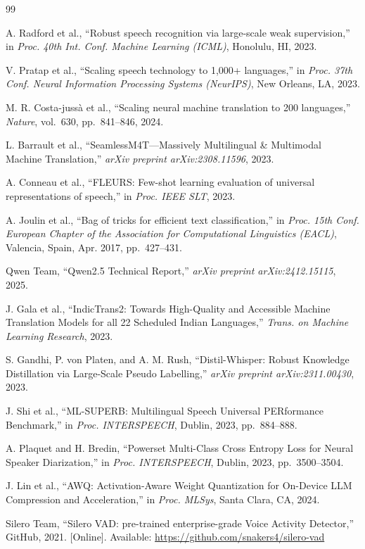 \documentclass[conference]{IEEEtran}
\begin{document}
\begin{thebibliography}{99}

 A. Radford et al., ``Robust speech recognition via large-scale weak supervision,'' in \textit{Proc. 40th Int. Conf. Machine Learning (ICML)}, Honolulu, HI, 2023.

 V. Pratap et al., ``Scaling speech technology to 1,000+ languages,'' in \textit{Proc. 37th Conf. Neural Information Processing Systems (NeurIPS)}, New Orleans, LA, 2023.

 M. R. Costa-juss\`a et al., ``Scaling neural machine translation to 200 languages,'' \textit{Nature}, vol.~630, pp.~841--846, 2024.

 L. Barrault et al., ``SeamlessM4T---Massively Multilingual \& Multimodal Machine Translation,'' \textit{arXiv preprint arXiv:2308.11596}, 2023.

 A. Conneau et al., ``FLEURS: Few-shot learning evaluation of universal representations of speech,'' in \textit{Proc. IEEE SLT}, 2023.

 A. Joulin et al., ``Bag of tricks for efficient text classification,'' in \textit{Proc. 15th Conf. European Chapter of the Association for Computational Linguistics (EACL)}, Valencia, Spain, Apr. 2017, pp.~427--431.

 Qwen Team, ``Qwen2.5 Technical Report,'' \textit{arXiv preprint arXiv:2412.15115}, 2025.

 J. Gala et al., ``IndicTrans2: Towards High-Quality and Accessible Machine Translation Models for all 22 Scheduled Indian Languages,'' \textit{Trans. on Machine Learning Research}, 2023.

 S. Gandhi, P. von Platen, and A. M. Rush, ``Distil-Whisper: Robust Knowledge Distillation via Large-Scale Pseudo Labelling,'' \textit{arXiv preprint arXiv:2311.00430}, 2023.

 J. Shi et al., ``ML-SUPERB: Multilingual Speech Universal PERformance Benchmark,'' in \textit{Proc. INTERSPEECH}, Dublin, 2023, pp.~884--888.

 A. Plaquet and H. Bredin, ``Powerset Multi-Class Cross Entropy Loss for Neural Speaker Diarization,'' in \textit{Proc. INTERSPEECH}, Dublin, 2023, pp.~3500--3504.

 J. Lin et al., ``AWQ: Activation-Aware Weight Quantization for On-Device LLM Compression and Acceleration,'' in \textit{Proc. MLSys}, Santa Clara, CA, 2024.

 Silero Team, ``Silero VAD: pre-trained enterprise-grade Voice Activity Detector,'' GitHub, 2021. [Online]. Available: \url{https://github.com/snakers4/silero-vad}

\end{thebibliography}
\end{document}
